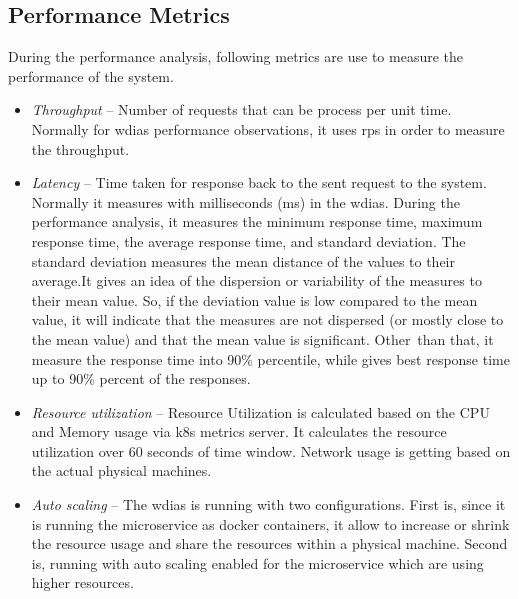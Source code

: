 \subsection{Performance Metrics}%
\label{subse:test_plan_metrics}
During the performance analysis, following metrics are use to measure the performance of the system.
\begin{itemize}
    \item \emph{Throughput} -- Number of requests that can be process per unit time. Normally for \acrshort{wdias} performance observations, it uses \acrfull{rps} in order to measure the throughput.
    \item \emph{Latency} -- Time taken for response back to the sent request to the system. Normally it measures with milliseconds (ms) in the \acrshort{wdias}. During the performance analysis, it measures the minimum response time, maximum response time, the average response time, and standard deviation. The standard deviation measures the mean distance of the values to their average.It gives an idea of the dispersion or variability of the measures to their mean value. So, if the deviation value is low compared to the mean value, it will indicate that the measures are not dispersed (or mostly close to the mean value) and that the mean value is significant. Other than that, it measure the response time into 90\% percentile, while gives best response time up to 90\% percent of the responses.
    \item \emph{Resource utilization} -- Resource Utilization is calculated based on the CPU and Memory usage via \acrshort{k8s} metrics server. It calculates the resource utilization over 60 seconds of time window. Network usage is getting based on the actual physical machines.
    \item \emph{Auto scaling} -- The \acrshort{wdias} is running with two configurations. First is, since it is running the microservice as docker containers, it allow to increase or shrink the resource usage and share the resources within a physical machine. Second is, running with auto scaling enabled for the microservice which are using higher resources.
\end{itemize}
